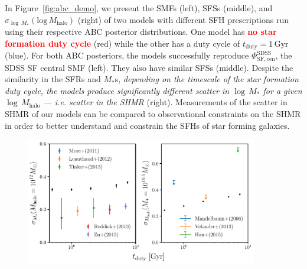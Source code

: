 \documentclass[12pt, letterpaper, preprint]{aastex}
\newcommand{\todo}[1]{{\bf \textcolor{red}{#1}}}
\begin{document}
In Figure~\ref{fig:abc_demo}, we present the SMFs (left), SFSs (middle), and 
$\sigma_{\log\,M_*}(\mathrm{log}\,M_\mathrm{halo})$ (right) of two models 
with different SFH prescriptions run using their respective ABC posterior 
distributions. One model has \todo{no star formation duty cycle} (red) while the 
other has a duty cycle of $t_\mathrm{duty} = 1\,\mathrm{Gyr}$ (blue). 
For both ABC posteriors, the models successfully reproduce $\Phi^\mathrm{SDSS}_\mathrm{SF,cen}$, 
the SDSS SF central SMF (left).  %
They also have similar SFSs (middle). Despite the similarity in the SFRs and 
$M_*$s, \emph{depending on the timescale of the star formation duty cycle, the models 
produce significantly different scatter in $\log\,M_*$ for a given $
\log\,M_\mathrm{halo}$ --- \emph{i.e.} scatter in the SHMR} (right).
Measurements of the scatter in SHMR of our models can be compared to observational 
constraints on the SHMR in order to better understand and constrain the 
SFHs of star forming galaxies.

\begin{figure}
\begin{center}
\includegraphics[width=0.9\textwidth]{figs/SHMRscatter_tduty.pdf}
\caption{}
\label{fig:sigMstar_duty}
\end{center}
\end{figure}
\end{document}

